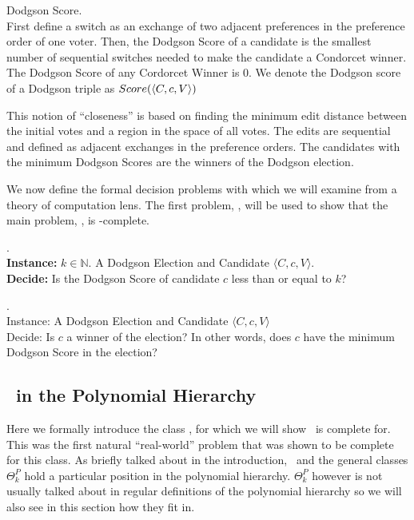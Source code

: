 \begin{defn}{Dodgson Score.}\label{def:dscore}\\
    First define a switch as an exchange of two adjacent preferences in the
    preference order of one voter.
    Then, the Dodgson Score of a candidate is the smallest number of sequential
    switches needed to make the candidate a
    Condorcet winner.
    The Dodgson Score of any Cordorcet Winner is 0.
    We denote the Dodgson score of a Dodgson triple as $Score(\langle C,c,V \rangle)$
\end{defn}

This notion of ``closeness'' is based on finding the minimum edit distance
between the initial votes and a region in the space of all votes.
The edits are sequential and defined as adjacent exchanges in the preference orders.
The candidates with the minimum Dodgson Scores are the winners of the
Dodgson election.

We now define the formal decision problems with which we will examine from a
theory of computation lens.
The first problem, \dscore, will be used to show that the main problem,
\dwin, is \tp-complete.

\begin{problem}{.} \\
    \tab \textbf{Instance:} $k \in \mathbb{N}$.
        A Dodgson Election and Candidate $\langle C,c,V \rangle$. \\
    \tab \textbf{Decide:} Is the Dodgson Score of candidate $c$ less than or
        equal to $k$?
\end{problem}

\begin{problem}{.} \\
    \tab Instance: A Dodgson Election and Candidate $\langle C,c,V \rangle$ \\
    \tab Decide: Is $c$ a winner of the election?
    In other words, does $c$ have the minimum Dodgson Score in the election?

\end{problem}


\subsection{\tp~in the Polynomial Hierarchy}

Here we formally introduce the class \tp, for which
we will show \dwin~is complete for.
This was the first natural ``real-world'' problem that was shown to be complete
for this class.
As briefly talked about in the introduction, \tp~and the
general classes $\Theta_{k}^P$ hold a particular position
in the polynomial hierarchy.
$\Theta_{k}^P$ however is not usually talked about in regular definitions of
the polynomial hierarchy so we will also see in this section how they fit in.

